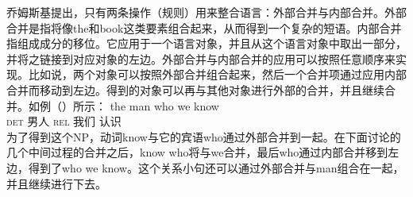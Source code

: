 乔姆斯基提出，只有两条操作（规则）用来整合语言：外部合并与内部合并。外部合并是指将像the和book这类要素组合起来，从而得到一个复杂的短语。内部合并指组成成分的移位。它应用于一个语言对象，并且从这个语言对象中取出一部分，并将之链接到对应对象的左边。外部合并与内部合并的应用可以按照任意顺序来实现。比如说，两个对象可以按照外部合并组合起来，然后一个合并项通过应用内部合并而移动到左边。得到的对象可以再与其他对象进行外部的合并，并且继续合并。如例（）所示：
\ea
\gll the          man who            we know\\
     \textsc{det} 男人 \textsc{rel} 我们 认识\\
\z
为了得到这个NP，动词know与它的宾语who通过外部合并到一起。在下面讨论的几个中间过程的合并之后，know who将与we合并，最后who通过内部合并移到左边，得到了who we know。这个关系小句还可以通过外部合并与man组合在一起，并且继续进行下去。

